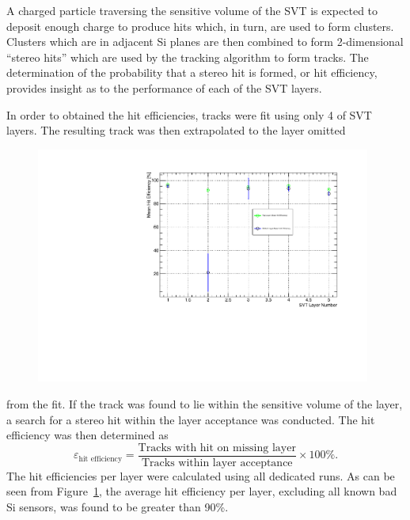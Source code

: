 
%
%
 
A charged particle traversing the sensitive volume of the SVT is expected to
deposit enough charge to produce hits which, in turn, are used to form 
clusters. Clusters which are in adjacent Si planes are then combined to form
2-dimensional ``stereo hits'' which are used by the tracking algorithm to 
form tracks.  The determination of the probability that a stereo hit is 
formed, or hit efficiency, provides insight as to the performance of each of 
the SVT layers.

In order to obtained the hit efficiencies, tracks were fit using only 4 of 
SVT layers. The resulting track was then extrapolated to the layer omitted
\begin{figure}[h]
    \begin{center}
    	\includegraphics[width=0.98\textwidth]{test2012/svtperformance/trk_performance/mean_hit_efficiency_vs_layer.pdf}
        \caption{} 
	\label{fig:hit_efficiency}
    \end{center}
\end{figure}
from the fit. If the track was found to lie within the sensitive volume
of the layer, a search for a stereo hit within the layer acceptance was 
conducted.  The hit efficiency was then determined as
\[
    \varepsilon_{\mbox{hit efficiency}} = \frac{\mbox{Tracks with hit on missing layer}}
                                            {\mbox{Tracks within layer acceptance}} \times 100 \%.
\]
The hit efficiencies per layer were calculated using all dedicated runs. As 
can be seen from Figure~\ref{fig:hit_efficiency}, the average hit efficiency
per layer, excluding all known bad Si sensors, was found to be greater than
90\%.

